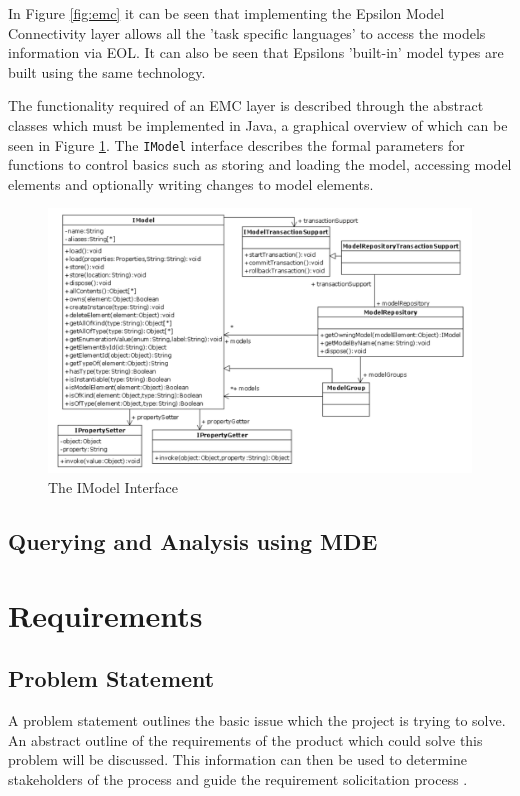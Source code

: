 \documentclass[11pt]{book}
\newcommand{\code}[1]{\texttt{#1}}
\begin{document}
In Figure \ref{fig:emc} it can be seen that implementing the Epsilon Model Connectivity layer allows all the 'task specific languages' to access the models information via EOL. It can also be seen that Epsilons 'built-in' model types are built using the same technology.

The functionality required of an EMC layer is described through the abstract classes which must be implemented in Java, a graphical overview of which can be seen in Figure \ref{fig:imodelinterface}. The \code{IModel} interface describes the formal parameters for functions to control basics such as storing and loading the model, accessing model elements and optionally writing changes to model elements.



\begin{figure}[h]
	\centering
	\includegraphics[width=\textwidth]{images/imodel-interface}
	\caption{The IModel Interface \cite{theepsilonbook}}
	\label{fig:imodelinterface}
\end{figure}



\section{Querying and Analysis using MDE}

\chapter{Requirements}
\section{Problem Statement}
\label{problemstatement}
A problem statement outlines the basic issue which the project is trying to solve. An abstract outline of the requirements of the product which could solve this problem will be discussed. This information can then be used to determine stakeholders of the process and guide the requirement solicitation process \cite{problemstatement}.
\end{document}
